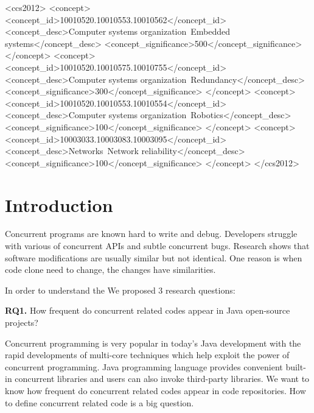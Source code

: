 \documentclass{sig-alternate-05-2015}
\begin{document}
%
%
\begin{CCSXML}
<ccs2012>
 <concept>
  <concept_id>10010520.10010553.10010562</concept_id>
  <concept_desc>Computer systems organization~Embedded systems</concept_desc>
  <concept_significance>500</concept_significance>
 </concept>
 <concept>
  <concept_id>10010520.10010575.10010755</concept_id>
  <concept_desc>Computer systems organization~Redundancy</concept_desc>
  <concept_significance>300</concept_significance>
 </concept>
 <concept>
  <concept_id>10010520.10010553.10010554</concept_id>
  <concept_desc>Computer systems organization~Robotics</concept_desc>
  <concept_significance>100</concept_significance>
 </concept>
 <concept>
  <concept_id>10003033.10003083.10003095</concept_id>
  <concept_desc>Networks~Network reliability</concept_desc>
  <concept_significance>100</concept_significance>
 </concept>
</ccs2012>  
\end{CCSXML}



%
%

%
%
\printccsdesc



\section{Introduction}
Concurrent programs are known hard to write and debug. Developers struggle with various of concurrent APIs and subtle concurrent bugs. Research shows that software modifications are usually similar but not identical. One reason is when code clone need to change, the changes have similarities.

In order to understand the We proposed 3 research questions:

\textbf{RQ1.} How frequent do concurrent related codes appear in Java open-source projects?

Concurrent programming is very popular in today's Java development with the rapid developments of multi-core techniques which help exploit the power of concurrent programming. Java programming language provides convenient built-in concurrent libraries and users can also invoke third-party libraries. We want to know how frequent do concurrent related codes appear in code repositories. How to define concurrent related code is a big question.
\end{document}
